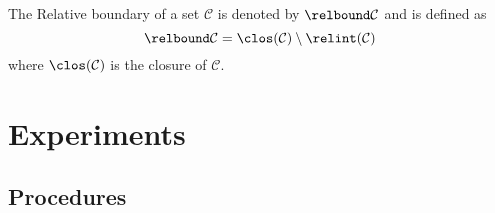 \begin{definition}
  \label{def:relative-boundary}
  The Relative boundary of a set \(\mathcal{C}\) is denoted by \(\relbound \mathcal{C}\) and is defined as
  \begin{equation}
    \label{eq:relative-boundary}
    \relbound \mathcal{C} = \clos(\mathcal{C}) \setminus \relint(\mathcal{C})
  \end{equation}
  where \(\clos(\mathcal{C})\) is the closure of \(\mathcal{C}\).
\end{definition}

\section{Experiments}
\subsection{Procedures}
\FloatBarrier

